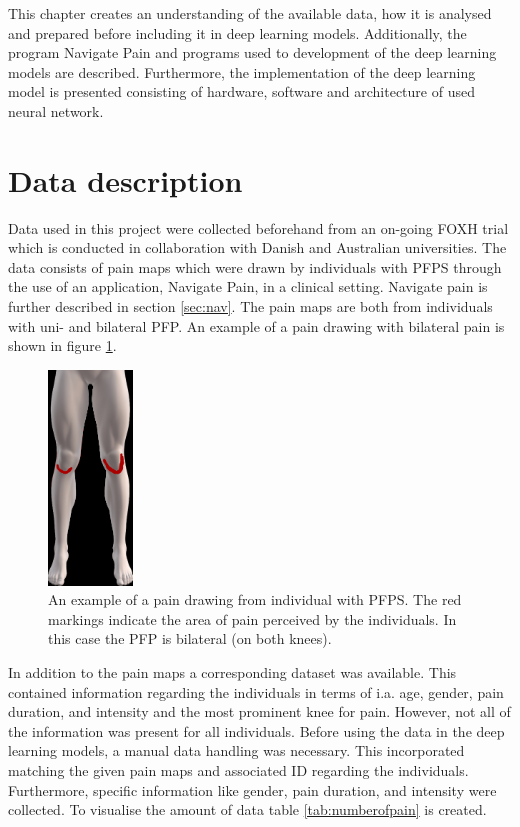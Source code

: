 This chapter creates an understanding of the available data, how it is analysed and prepared before including it in deep learning models. Additionally, the program Navigate Pain and programs used to development of the deep learning models are described. Furthermore, the implementation of the deep learning model is presented consisting of hardware, software and architecture of used neural network.

\section{Data description}
Data used in this project were collected beforehand from an on-going FOXH trial which is conducted in collaboration with Danish and Australian universities. The data consists of pain maps which were drawn by individuals with PFPS through the use of an application, Navigate Pain, in a clinical setting. Navigate pain is further described in section \ref{sec:nav}. The pain maps are both from individuals with uni- and bilateral PFP. An example of a pain drawing with bilateral pain is shown in figure \ref{fig:kneepainmap}.

\begin{figure} [H]
\centering
\includegraphics[width=0.2\textwidth]{figures/kneepainmap}
\caption{An example of a pain drawing from individual with PFPS. The red markings indicate the area of pain perceived by the individuals. In this case the PFP is bilateral (on both knees).}
\label{fig:kneepainmap}
\end{figure}

\noindent
In addition to the pain maps a corresponding dataset was available. This contained information regarding the individuals in terms of i.a. age, gender, pain duration, and intensity and the most prominent knee for pain. However, not all of the information was present for all individuals.
Before using the data in the deep learning models, a manual data handling was necessary. This incorporated matching the given pain maps and associated ID regarding the individuals. Furthermore, specific information like gender, pain duration, and intensity were collected. To visualise the amount of data table \ref{tab:numberofpain} is created.

